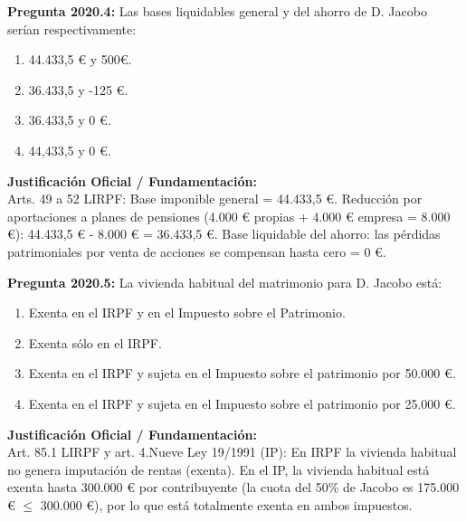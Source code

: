 \documentclass[11pt,a4paper,openany]{article}
\begin{document}
\noindent\textbf{\sffamily Pregunta 2020.4:} Las bases liquidables general y del ahorro de D. Jacobo serían respectivamente:\\[0.15cm]
\begin{enumerate}[label=\textbf{\alph*)},leftmargin=1.8em,itemsep=1.5pt,topsep=2pt,partopsep=0pt,parsep=0pt]
    \item 44.433,5 \euro{} y 500\euro{}.
    \item 36.433,5 y -125 \euro{}.
    \item 36.433,5 y 0 \euro{}.
    \item 44,433,5 y 0 \euro{}.
\end{enumerate}
\begin{solucionBox}
\textbf{Justificación Oficial / Fundamentación:}\\[0.1cm]
Arts. 49 a 52 LIRPF: Base imponible general = 44.433,5 \euro{}. Reducción por aportaciones a planes de pensiones (4.000 \euro{} propias + 4.000 \euro{} empresa = 8.000 \euro{}): 44.433,5 \euro{} - 8.000 \euro{} = 36.433,5 \euro{}. Base liquidable del ahorro: las pérdidas patrimoniales por venta de acciones se compensan hasta cero = 0 \euro{}.
\end{solucionBox}
\vspace{0.35cm}

\noindent\textbf{\sffamily Pregunta 2020.5:} La vivienda habitual del matrimonio para D. Jacobo está:\\[0.15cm]
\begin{enumerate}[label=\textbf{\alph*)},leftmargin=1.8em,itemsep=1.5pt,topsep=2pt,partopsep=0pt,parsep=0pt]
    \item Exenta en el IRPF y en el Impuesto sobre el Patrimonio.
    \item Exenta sólo en el IRPF.
    \item Exenta en el IRPF y sujeta en el Impuesto sobre el patrimonio por 50.000 \euro{}.
    \item Exenta en el IRPF y sujeta en el Impuesto sobre el patrimonio por 25.000 \euro{}.
\end{enumerate}
\begin{solucionBox}
\textbf{Justificación Oficial / Fundamentación:}\\[0.1cm]
Art. 85.1 LIRPF y art. 4.Nueve Ley 19/1991 (IP): En IRPF la vivienda habitual no genera imputación de rentas (exenta). En el IP, la vivienda habitual está exenta hasta 300.000 \euro{} por contribuyente (la cuota del 50\% de Jacobo es 175.000 \euro{} $\le$  300.000 \euro{}), por lo que está totalmente exenta en ambos impuestos.
\end{solucionBox}
\vspace{0.35cm}
\end{document}
